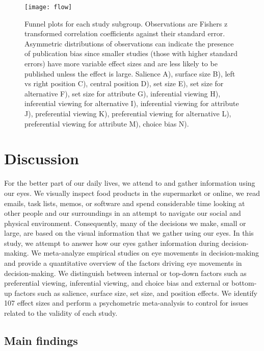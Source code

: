 \documentclass{article}
\begin{document}
\begin{figure}[H]
\texttt{[image: flow]}
\centering
\caption{Funnel plots for each study subgroup. Observations are Fishers z transformed correlation coefficients against their standard error. Asymmetric distributions of observations can indicate the presence of publication bias since smaller studies (those with higher standard errors) have more variable effect sizes and are less likely to be published unless the effect is large. Salience A), surface size B), left vs right position C), central position D), set size E), set size for alternative F), set size for attribute G), inferential viewing H), inferential viewing for alternative I), inferential viewing for attribute J), preferential viewing K), preferential viewing for alternative L), preferential viewing for attribute M), choice bias N).}
\label{fig:funnel_plots}
\end{figure}



\section{Discussion}

For the better part of our daily lives, we attend to and gather information using our eyes. We visually inspect food products in the supermarket or online, we read emails, task lists, memos, or software and spend considerable time looking at other people and our surroundings in an attempt to navigate our social and physical environment. Consequently, many of the decisions we make, small or large, are based on the visual information that we gather using our eyes. In this study, we attempt to answer how our eyes gather information during decision-making. We meta-analyze empirical studies on eye movements in decision-making and provide a quantitative overview of the factors driving eye movements in decision-making. We distinguish between internal or top-down factors such as preferential viewing, inferential viewing, and choice bias and external or bottom-up factors such as salience, surface size, set size, and position effects. We identify 107 effect sizes and perform a psychometric meta-analysis to control for issues related to the validity of each study. 

\subsection{Main findings}
\end{document}
